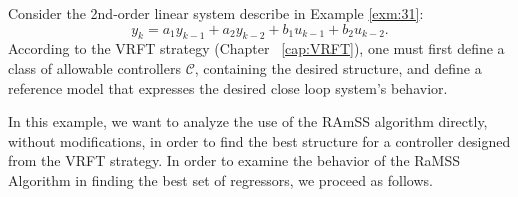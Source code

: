 


\begin{exmp}\label{ex:sis2aord}

  Consider the 2nd-order linear system describe in Example \ref{exm:31}: 
  \begin{equation}
    \label{eq:sis2aord}
    y_k = a_1y_{k-1} + a_2y_{k-2} + b_1u_{k-1} + b_2u_{k-2}.
  \end{equation}
  According to the VRFT strategy (Chapter ~\ref{cap:VRFT}), one must first define a class of allowable controllers $\mathscr{C}$, containing the desired  structure, and define a reference model that expresses the desired close loop system's behavior.

  In this example, we want to analyze the use of the RAmSS algorithm directly, without modifications, in order to find the best structure for a controller designed from the VRFT strategy.
  In order to examine the behavior of the RaMSS Algorithm in finding the best set of regressors, we proceed as follows.


\end{exmp}
